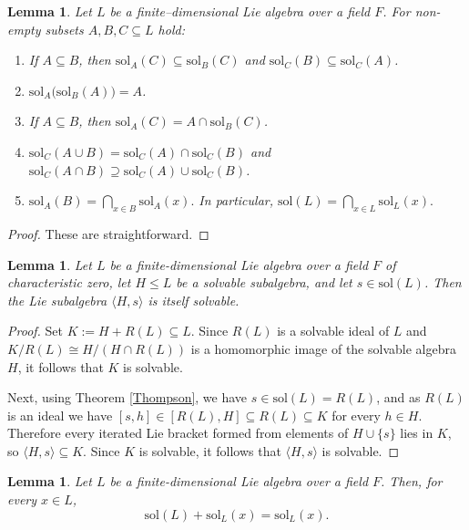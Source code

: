 \documentclass[11pt]{amsart}
\theoremstyle{plain}
\newtheorem{lemma}[theorem]{Lemma}
\def\sol{\mathrm{sol}}
\begin{document}
\begin{lemma}\label{Lie-2.9}
Let $L$ be a finite–dimensional Lie algebra over a field $F$.
For non-empty subsets $A, B, C\subseteq L$ hold:
\begin{enumerate}
\item If $A\subseteq B$, then $\sol_{A}(C)\subseteq\sol_{B}(C)$  
      and $\sol_{C}(B)\subseteq\sol_{C}(A)$.

\item $\sol_{A}\!\bigl(\sol_{B}(A)\bigr)=A$.

\item If $A\subseteq B$, then
      $\sol_{A}(C)=A\cap\sol_{B}(C)$.

\item $\sol_{C}(A\cup B)=\sol_{C}(A)\cap\sol_{C}(B)$ and  
      $\sol_{C}(A\cap B)\supseteq\sol_{C}(A)\cup\sol_{C}(B)$.

\item $\displaystyle
      \sol_{A}(B)=\bigcap_{x\in B}\sol_{A}(x).$
      In particular,
      $\displaystyle
      \sol(L)=\bigcap_{x\in L}\sol_L(x).$
\end{enumerate}
\end{lemma}

\begin{proof} 
These are straightforward. 
\end{proof}



\begin{lemma}\label{Lie-2.6}
Let $L$ be a finite-dimensional Lie algebra over a field $F$ of characteristic zero,
let $H\le L$ be a solvable subalgebra, and let $s\in\sol(L)$.
Then the Lie subalgebra $\langle H, s\rangle$ is itself solvable.
\end{lemma}

\begin{proof}
Set $K:=H+R(L)\subseteq L$. Since $R(L)$ is a solvable ideal of $L$ and $K/R(L)\cong H/(H\cap R(L))$ is a homomorphic image of the solvable algebra $H$, it follows that $K$ is solvable. 

Next, using Theorem \ref{Thompson}, we have $s\in \sol(L)=R(L)$, and as $R(L)$ is an ideal we have
$[s,h]\in [R(L),H]\subseteq R(L)\subseteq K$ for every $h\in H$. Therefore every
iterated Lie bracket formed from elements of $H\cup\{s\}$ lies in $K$, so
$\langle H,s\rangle\subseteq K$. Since $K$ is solvable, it follows that $\langle H,s\rangle$ is
solvable.
\end{proof}


\begin{lemma}\label{Lie-2.7}
Let $L$ be a finite-dimensional Lie algebra over a field $F$. Then, for every $x\in L$,
\[\sol(L) + \sol_L(x) = \sol_L(x).\]
\end{lemma}
\end{document}
